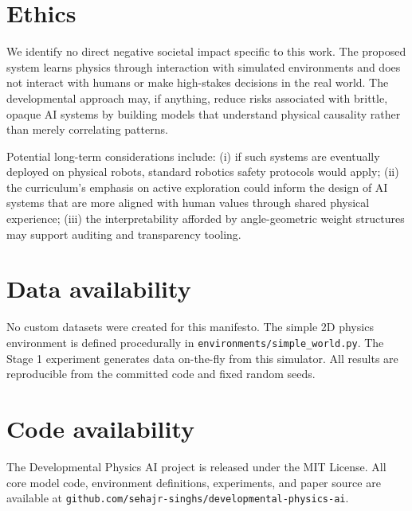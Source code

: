 \documentclass[11pt,oneside]{article}
\begin{document}
\section*{Ethics}

We identify no direct negative societal impact specific to this work. The proposed system learns physics through interaction with simulated environments and does not interact with humans or make high-stakes decisions in the real world. The developmental approach may, if anything, reduce risks associated with brittle, opaque AI systems by building models that understand physical causality rather than merely correlating patterns.

Potential long-term considerations include: (i) if such systems are eventually deployed on physical robots, standard robotics safety protocols would apply; (ii) the curriculum's emphasis on active exploration could inform the design of AI systems that are more aligned with human values through shared physical experience; (iii) the interpretability afforded by angle-geometric weight structures may support auditing and transparency tooling.

\section*{Data availability}

No custom datasets were created for this manifesto. The simple 2D physics environment is defined procedurally in \texttt{environments/simple\_world.py}. The Stage 1 experiment generates data on-the-fly from this simulator. All results are reproducible from the committed code and fixed random seeds.

\section*{Code availability}

The Developmental Physics AI project is released under the MIT License. All core model code, environment definitions, experiments, and paper source are available at \texttt{github.com/sehajr-singhs/developmental-physics-ai}.
\end{document}
